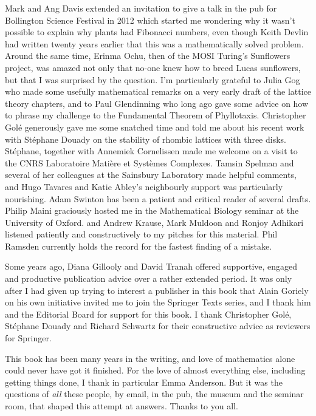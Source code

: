 


Mark and Ang Davis extended an invitation to give a talk in the pub for Bollington Science Festival in 2012 which started me wondering why it wasn't possible to explain why plants had Fibonacci numbers, even though Keith Devlin had written twenty years earlier that this was a mathematically solved problem. Around the same time, Erinma Ochu, then of the MOSI Turing's Sunflowers project, was amazed not only that no-one knew how to breed Lucas sunflowers, but that I was surprised by the question.  
I'm particularly grateful to Julia Gog who made some usefully mathematical remarks on a very early draft of the lattice theory chapters, and to Paul Glendinning who long ago gave some advice on how to phrase my challenge to the Fundamental Theorem of Phyllotaxis.
Christopher Golé generously gave me some snatched time and told me about his recent work with Stéphane Douady on the stability of rhombic lattices with three disks. Stéphane, together with  Annemiek Cornelissen made me welcome on a visit to the CNRS Laboratoire Matière et Systèmes Complexes. Tamsin Spelman and several of her colleagues at the Sainsbury Laboratory made helpful comments, and Hugo Tavares and Katie Abley's neighbourly support was particularly nourishing. Adam Swinton has been a patient and critical reader of several drafts.   Philip Maini graciously hosted me in the Mathematical Biology seminar at the University of Oxford. and Andrew Krause, Mark Muldoon and Ronjoy Adhikari listened patiently and constructively to my pitches for this material. Phil Ramsden currently holds the record for the fastest finding of a mistake.  

Some years ago,  Diana Gillooly and David Tranah offered supportive, engaged and productive publication advice over a rather extended period. It was only after I had given up trying to interest a publisher in this book that Alain Goriely on his own initiative invited me to join the Springer Texts series, and I thank him and the Editorial Board for support for this book. I thank Christopher Golé, Stéphane Douady and Richard Schwartz for their constructive advice as reviewers for Springer. 


This book has been many years in the writing, and love of mathematics alone could never have got it finished. For the love of almost everything else, including getting things done, I thank in particular Emma Anderson. But it was the questions of \textit{all} these people, by email, in the pub, the museum and the seminar room, that shaped this attempt at answers.  Thanks to you all. 


